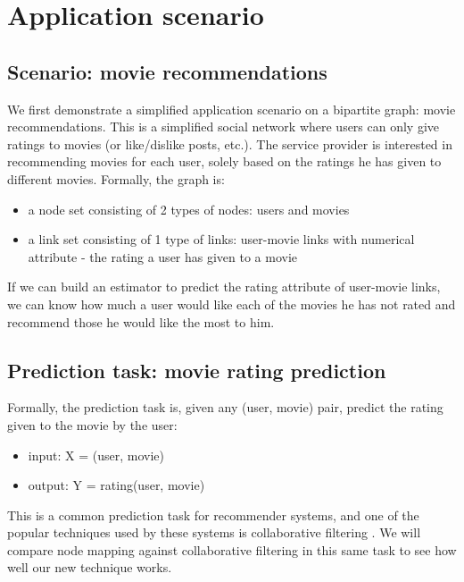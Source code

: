 \documentclass{article}
\begin{document}
\section{Application scenario}

\subsection{Scenario: movie recommendations}
We first demonstrate a simplified application scenario on a bipartite graph: 
movie recommendations.
This is a simplified social network where users can only give ratings to movies 
(or like/dislike posts, etc.).
The service provider is interested in recommending movies for each user, solely 
based on the ratings he has given to different movies.
Formally, the graph is:
\begin{itemize}
	\item a node set consisting of 2 types of nodes: users and movies
	\item a link set consisting of 1 type of links: user-movie links with 
	numerical attribute - the rating a user has given to a movie
\end{itemize}
If we can build an estimator to predict the rating attribute of user-movie 
links, we can know how much a user would like each of the movies he has not 
rated and recommend those he would like the most to him.

\subsection{Prediction task: movie rating prediction}
Formally, the prediction task is, given any (user, movie) pair, predict the 
rating given to the movie by the user:
\begin{itemize}
	\item input: X = (user, movie)
	\item output: Y = rating(user, movie)
\end{itemize}
This is a common prediction task for recommender systems,
and one of the popular techniques used by these systems is collaborative 
filtering \cite{polatidis2016multi}.
We will compare node mapping against collaborative filtering in this same 
task to see how well our new technique works.
\end{document}
